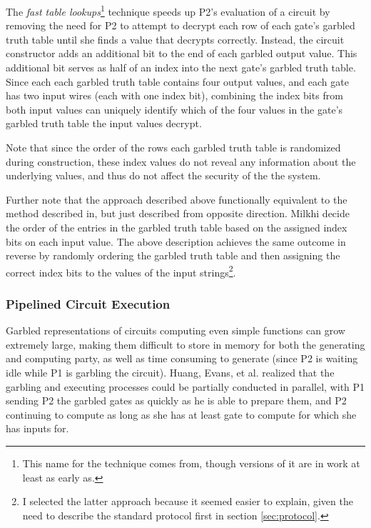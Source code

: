 The \emph{fast table lookups}\footnote{This name for the technique comes from\cite{huang2011faster}, though versions of it are in work at least as early as\cite{malkhi2004fairplay}.} technique speeds up \ac{P2}'s evaluation of a circuit by removing the need for \ac{P2} to attempt to decrypt each row of each gate's garbled truth table until she finds a value that decrypts correctly.  Instead, the circuit constructor adds an additional bit to the end of each garbled output value. This additional bit serves as half of an index into the next gate's garbled truth table. Since each each garbled truth table contains four output values, and each gate has two input wires (each with one index bit), combining the index bits from both input values can uniquely identify which of the four values in the gate's garbled truth table the input values decrypt.

Note that since the order of the rows each garbled truth table is randomized during construction, these index values do not reveal any information about the underlying values, and thus do not affect the security of the the system.

Further note that the approach described above functionally equivalent to the method described in\cite{malkhi2004fairplay}, but just described from opposite direction.  Milkhi decide the order of the entries in the garbled truth table based on the assigned index bits on each input value.  The above description achieves the same outcome in reverse by randomly ordering the garbled truth table and then assigning the correct index bits to the values of the input strings\footnote{I selected the latter approach because it seemed easier to explain, given the need to describe the standard protocol first in section \ref{sec:protocol}.}.

\subsubsection{Pipelined Circuit Execution}

Garbled representations of circuits computing even simple functions can grow extremely large, making them difficult to store in memory for both the generating and computing party, as well as time consuming to generate (since \ac{P2} is waiting idle while \ac{P1} is garbling the circuit).  Huang, Evans, et al.\cite{huang2011faster} realized that the garbling and executing processes could be partially conducted in parallel, with \ac{P1} sending \ac{P2} the garbled gates as quickly as he is able to prepare them, and \ac{P2} continuing to compute as long as she has at least gate to compute for which she has inputs for.

